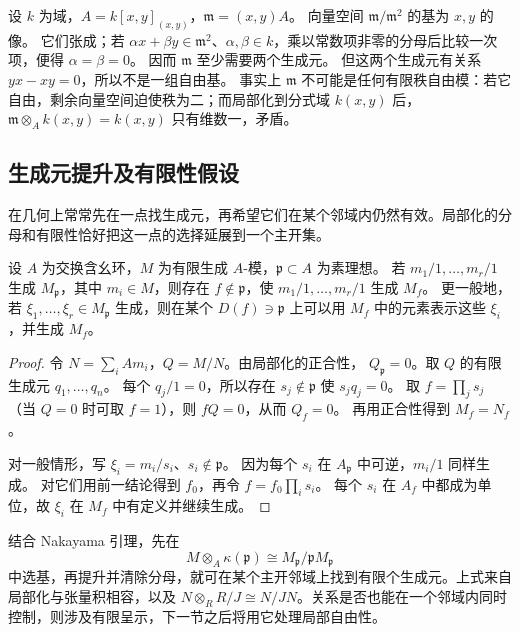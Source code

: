 \begin{example}\label{g5:exm:two-generators-maximal-ideal}
	设 \(k\) 为域，\(A=k[x,y]_{(x,y)}\)，\(\mathfrak m=(x,y)A\)。 向量空间 \(\mathfrak m/\mathfrak m^2\) 的基为 \(x,y\) 的像。 它们张成；若 \(\alpha x+\beta y\in\mathfrak m^2\)、\(\alpha,\beta\in k\)，乘以常数项非零的分母后比较一次项，便得 \(\alpha=\beta=0\)。 因而 \(\mathfrak m\) 至少需要两个生成元。 但这两个生成元有关系 \(y x-x y=0\)，所以不是一组自由基。 事实上 \(\mathfrak m\) 不可能是任何有限秩自由模：若它自由，剩余向量空间迫使秩为二；而局部化到分式域 \(k(x,y)\) 后， \(\mathfrak m\otimes_A k(x,y)=k(x,y)\) 只有维数一，矛盾。
\end{example}

\subsection{生成元提升及有限性假设}
\label{g5:subsec:0203:04}

在几何上常常先在一点找生成元，再希望它们在某个邻域内仍然有效。局部化的分母和有限性恰好把这一点的选择延展到一个主开集。

\begin{proposition}\label{g5:prop:generators-near-prime}
	设 \(A\) 为交换含幺环，\(M\) 为有限生成 \(A\)-模，\(\mathfrak p\subset A\) 为素理想。 若 \(m_1/1,\ldots,m_r/1\) 生成 \(M_{\mathfrak p}\)，其中 \(m_i\in M\)，则存在 \(f\notin\mathfrak p\)，使 \(m_1/1,\ldots,m_r/1\) 生成 \(M_f\)。 更一般地，若 \(\xi_1,\ldots,\xi_r\in M_{\mathfrak p}\) 生成，则在某个 \(D(f)\ni\mathfrak p\) 上可以用 \(M_f\) 中的元素表示这些 \(\xi_i\)，并生成 \(M_f\)。
\end{proposition}
\begin{proof}
	令 \(N=\sum_iAm_i\)，\(Q=M/N\)。由局部化的正合性， \(Q_{\mathfrak p}=0\)。取 \(Q\) 的有限生成元 \(q_1,\ldots,q_n\)。 每个 \(q_j/1=0\)，所以存在 \(s_j\notin\mathfrak p\) 使 \(s_jq_j=0\)。 取 \(f=\prod_js_j\)（当 \(Q=0\) 时可取 \(f=1\)），则 \(fQ=0\)，从而 \(Q_f=0\)。 再用正合性得到 \(M_f=N_f\)。

	对一般情形，写 \(\xi_i=m_i/s_i\)、\(s_i\notin\mathfrak p\)。 因为每个 \(s_i\) 在 \(A_{\mathfrak p}\) 中可逆，\(m_i/1\) 同样生成。 对它们用前一结论得到 \(f_0\)，再令 \(f=f_0\prod_i s_i\)。 每个 \(s_i\) 在 \(A_f\) 中都成为单位，故 \(\xi_i\) 在 \(M_f\) 中有定义并继续生成。
\end{proof}

结合 Nakayama 引理，先在
\[
	M\otimes_A\kappa(\mathfrak p)
	\cong M_{\mathfrak p}/\mathfrak pM_{\mathfrak p}
\]
中选基，再提升并清除分母，就可在某个主开邻域上找到有限个生成元。上式来自局部化与张量积相容，以及 \(N\otimes_R R/J\cong N/JN\)。关系是否也能在一个邻域内同时控制，则涉及有限呈示，下一节之后将用它处理局部自由性。

